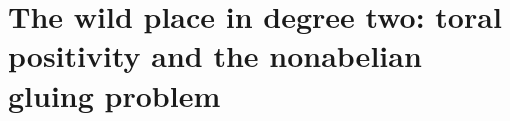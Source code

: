 \begingroup
\providecommand{\F}{}\renewcommand{\F}{F}
\providecommand{\Z}{}\renewcommand{\Z}{\mathbb Z}
\providecommand{\C}{}\renewcommand{\C}{\mathbb C}
\providecommand{\Q}{}\renewcommand{\Q}{\mathbb Q}
\providecommand{\Fq}{}\renewcommand{\Fq}{\mathbb F}
\providecommand{\Nm}{}\renewcommand{\Nm}{\operatorname N}
\providecommand{\Nrd}{}\renewcommand{\Nrd}{\operatorname{Nrd}}
\providecommand{\Trd}{}\renewcommand{\Trd}{\operatorname{Trd}}
\providecommand{\Tr}{}\renewcommand{\Tr}{\operatorname{Tr}}
\providecommand{\Irr}{}\renewcommand{\Irr}{\operatorname{Irr}}
\providecommand{\Ind}{}\renewcommand{\Ind}{\operatorname{Ind}}
\providecommand{\Ad}{}\renewcommand{\Ad}{\operatorname{Ad}}
\providecommand{\tH}{}\renewcommand{\tH}{\widetilde H}
\providecommand{\tZ}{}\renewcommand{\tZ}{\widetilde Z}
\providecommand{\tU}{}\renewcommand{\tU}{\widetilde U}
\providecommand{\tV}{}\renewcommand{\tV}{\widetilde V}
\providecommand{\tth}{}\renewcommand{\tth}{\widetilde\theta}
\providecommand{\Ocal}{}\renewcommand{\Ocal}{\mathcal O}
\providecommand{\Pfr}{}\renewcommand{\Pfr}{\mathfrak P}
\providecommand{\pfr}{}\renewcommand{\pfr}{\mathfrak p}
\providecommand{\Reg}{}\renewcommand{\Reg}{\operatorname{Reg}}
\providecommand{\Heis}{}\renewcommand{\Heis}{\mathrm{Heis}}
\providecommand{\Cubes}{}\renewcommand{\Cubes}{\mathrm{Cubes}}
\providecommand{\Good}{}\renewcommand{\Good}{\mathrm{Good}}
\providecommand{\Ptag}{}\renewcommand{\Ptag}{\textnormal{\textbf{(P)}}}
\providecommand{\Pctag}{}\renewcommand{\Pctag}{\textnormal{\textbf{(P$^{\mathrm c}$)}}}
\providecommand{\Etag}{}\renewcommand{\Etag}{\textnormal{\textbf{(E)}}}
\providecommand{\Otag}{}\renewcommand{\Otag}{\textnormal{\textbf{(O)}}}
\providecommand{\Ctag}{}\renewcommand{\Ctag}{\textnormal{\textbf{(C)}}}
\chapter[The wild place in degree two]{The wild place in degree two: toral positivity and the nonabelian gluing problem}\label{ch:W}

